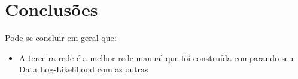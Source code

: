 \section{Conclusões}
	Pode-se concluir em geral que:\\
	\begin{itemize}
		\item A terceira rede é a melhor rede manual que foi construída comparando seu Data Log-Likelihood com as outras
	\end{itemize}

\clearpage